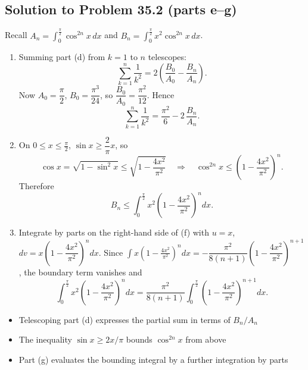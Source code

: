 
\subsection{Solution to Problem 35.2 (parts e--g)}

\begin{solution}
Recall $A_n = \displaystyle\int_{0}^{\frac{\pi}{2}} \cos^{2n} x \, dx$ and $B_n = \displaystyle\int_{0}^{\frac{\pi}{2}} x^2 \cos^{2n} x \, dx$.

\begin{enumerate}
\item[(e)] Summing part (d) from $k = 1$ to $n$ telescopes:
\[
\sum_{k=1}^{n}\frac{1}{k^2}
= 2\left(\frac{B_0}{A_0} - \frac{B_n}{A_n}\right).
\]
Now $A_0 = \dfrac{\pi}{2}$, $B_0 = \dfrac{\pi^3}{24}$, so $\dfrac{B_0}{A_0} = \dfrac{\pi^2}{12}$. Hence
\[
\sum_{k=1}^{n}\frac{1}{k^2} = \frac{\pi^2}{6} - 2\,\frac{B_n}{A_n}.
\]

\item[(f)] On $0 \le x \le \frac{\pi}{2}$, $\sin x \ge \dfrac{2}{\pi}x$, so
\[
\cos x = \sqrt{1 - \sin^2 x} \le \sqrt{1 - \frac{4x^2}{\pi^2}}
\quad\Longrightarrow\quad
\cos^{2n} x \le \left(1 - \frac{4x^2}{\pi^2}\right)^n.
\]
Therefore
\[
B_n \le \int_{0}^{\frac{\pi}{2}} x^2 \left(1 - \frac{4x^2}{\pi^2}\right)^n dx.
\]

\item[(g)] Integrate by parts on the right-hand side of (f) with $u = x$, $dv = x\left(1 - \dfrac{4x^2}{\pi^2}\right)^n dx$.
Since $\displaystyle\int x\left(1 - \frac{4x^2}{\pi^2}\right)^n dx
= -\dfrac{\pi^2}{8(n+1)}\left(1 - \dfrac{4x^2}{\pi^2}\right)^{n+1}$,
the boundary term vanishes and
\[
\int_{0}^{\frac{\pi}{2}} x^2 \left(1 - \frac{4x^2}{\pi^2}\right)^n dx
= \frac{\pi^2}{8(n+1)}\int_{0}^{\frac{\pi}{2}} \left(1 - \frac{4x^2}{\pi^2}\right)^{n+1} dx.
\]
\end{enumerate}
\end{solution}

\begin{takeaways}
\begin{itemize}
    \item Telescoping part (d) expresses the partial sum in terms of $B_n/A_n$
    \item The inequality $\sin x \ge 2x/\pi$ bounds $\cos^{2n} x$ from above
    \item Part (g) evaluates the bounding integral by a further integration by parts
\end{itemize}
\end{takeaways}
